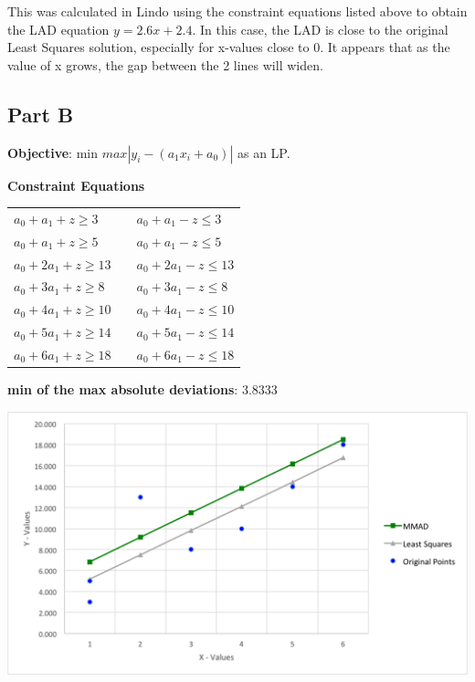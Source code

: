\documentclass[11pt,letterpaper]{article}
\begin{document}
This was calculated in Lindo using the constraint equations listed above to obtain the LAD equation $y = 2.6x + 2.4$. In this case, the LAD is close to the original Least Squares solution, especially for x-values close to 0. It appears that as the value of x grows, the gap between the 2 lines will widen.

\subsection*{Part B}
\textbf{Objective}: min $max |y_i -  (a_1x_i + a_0)|$ as an LP.\vspace{8pt}

\textbf{Constraint Equations}

\begin{tabular}{l l l}
$a_0+a_1+z\geq3$		&  & $a_0+a_1-z\leq3$\\
$a_0+a_1+z\geq5$ 		& & $a_0+a_1-z\leq5$\\
$a_0+2a_1+z\geq13$	& & $a_0+2a_1-z\leq13$\\
$a_0+3a_1+z\geq8$		& & $a_0+3a_1-z\leq8$\\
$a_0+4a_1+z\geq10$	& & $a_0+4a_1-z\leq10$\\
$a_0+5a_1+z\geq14$	& & $a_0+5a_1-z\leq14$\\
$a_0+6a_1+z\geq18$	& & $a_0+6a_1-z\leq18$\\
\end{tabular}\vspace{8pt}


\textbf{min of the max absolute deviations}: 3.8333\vspace{8pt}

\centerline{\includegraphics[width=7in]{mmad.png}}
\end{document}

